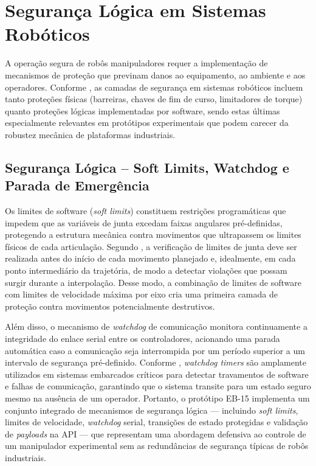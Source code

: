 \section{Segurança Lógica em Sistemas Robóticos}

A operação segura de robôs manipuladores requer a implementação de mecanismos de proteção que previnam danos ao equipamento, ao ambiente e aos operadores. Conforme , as camadas de segurança em sistemas robóticos incluem tanto proteções físicas (barreiras, chaves de fim de curso, limitadores de torque) quanto proteções lógicas implementadas por software, sendo estas últimas especialmente relevantes em protótipos experimentais que podem carecer da robustez mecânica de plataformas industriais.

\subsection{Segurança Lógica -- Soft Limits, Watchdog e Parada de Emergência}

Os limites de software (\textit{soft limits}) constituem restrições programáticas que impedem que as variáveis de junta excedam faixas angulares pré-definidas, protegendo a estrutura mecânica contra movimentos que ultrapassem os limites físicos de cada articulação. Segundo , a verificação de limites de junta deve ser realizada antes do início de cada movimento planejado e, idealmente, em cada ponto intermediário da trajetória, de modo a detectar violações que possam surgir durante a interpolação. Desse modo, a combinação de limites de software com limites de velocidade máxima por eixo cria uma primeira camada de proteção contra movimentos potencialmente destrutivos.

Além disso, o mecanismo de \textit{watchdog} de comunicação monitora continuamente a integridade do enlace serial entre os controladores, acionando uma parada automática caso a comunicação seja interrompida por um período superior a um intervalo de segurança pré-definido. Conforme , \textit{watchdog timers} são amplamente utilizados em sistemas embarcados críticos para detectar travamentos de software e falhas de comunicação, garantindo que o sistema transite para um estado seguro mesmo na ausência de um operador. Portanto, o protótipo EB-15 implementa um conjunto integrado de mecanismos de segurança lógica — incluindo \textit{soft limits}, limites de velocidade, \textit{watchdog} serial, transições de estado protegidas e validação de \textit{payloads} na API — que representam uma abordagem defensiva ao controle de um manipulador experimental sem as redundâncias de segurança típicas de robôs industriais.

